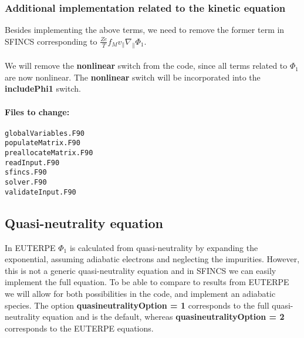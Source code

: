 \documentclass[12pt]{article}
\newcommand{\na}{\nabla}
\begin{document}
\subsubsection*{Additional implementation related to the kinetic equation}
Besides implementing the above terms, we need to remove the former term in SFINCS corresponding to $\displaystyle \frac{Z e}{T} f_M v_\| \na_\| \Phi_1$. \\
\\
We will remove the \textbf{nonlinear} switch from the code, since all terms related to $\Phi_1$ are now nonlinear. 
The \textbf{nonlinear} switch will be incorporated into the \textbf{includePhi1} switch.

\paragraph*{\textbf{Files to change:}}
\begin{verbatim}
globalVariables.F90
populateMatrix.F90
preallocateMatrix.F90
readInput.F90
sfincs.F90
solver.F90
validateInput.F90
\end{verbatim}




\newpage


























\newpage
\subsection*{Quasi-neutrality equation}
In EUTERPE $\Phi_1$ is calculated from quasi-neutrality by expanding the exponential, assuming adiabatic electrons and neglecting the impurities.
However, this is not a generic quasi-neutrality equation and in SFINCS we can easily implement the full equation. 
To be able to compare to results from EUTERPE we will allow for both possibilities in the code, and implement an adiabatic species. 
The option \textbf{quasineutralityOption = 1} corresponds to the full quasi-neutrality equation and is the default, 
whereas \textbf{quasineutralityOption = 2} corresponds to the EUTERPE equations.
\end{document}
